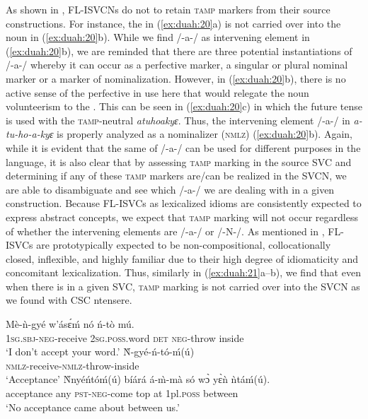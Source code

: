\documentclass[output=paper
,newtxmath
,modfonts
,nonflat]{langsci/langscibook}
\begin{document}
As shown in , FL-ISVCNs do not to retain \textsc{tamp} markers from their source constructions. For instance, the  in (\ref{ex:duah:20}a) is not carried over into the noun in (\ref{ex:duah:20}b). While we find /-a-/ as intervening element in (\ref{ex:duah:20}b), we are reminded that there are three potential instantiations of /-a-/ whereby it can occur as a perfective marker, a singular or plural nominal marker or a marker of nominalization. However, in (\ref{ex:duah:20}b), there is no active sense of the perfective in use here that would relegate the noun volunteerism to the . This can be seen in (\ref{ex:duah:20}c) in which the future tense is used with the \textsc{tamp}-neutral \textit{atuhoakyɛ}. Thus, the intervening element /-a-/ in \textit{a-tu-ho-a-kyɛ} is properly analyzed as a nominalizer (\textsc{nmlz}) (\ref{ex:duah:20}b). Again, while it is evident that the same  of /-a-/ can be used for different purposes in the language, it is also clear that by assessing \textsc{tamp} marking in the source SVC and determining if any of these \textsc{tamp} markers are/can be realized in the SVCN, we are able to disambiguate and see which /-a-/ we are dealing with in a given construction. Because FL-ISVCs as lexicalized idioms are consistently expected to express abstract concepts, we expect that \textsc{tamp} marking will not occur regardless of whether the intervening elements are /-a-/ or /-N-/. As mentioned in , FL-ISVCs are prototypically expected to be non-compositional, collocationally closed, inflexible, and highly familiar due to their high degree of idiomaticity and concomitant lexicalization. Thus, similarly in (\ref{ex:duah:21}a--b), we find that even when there is  in a given SVC, \textsc{tamp} marking is not carried over into the SVCN as we found with CSC ntensere.

\ea\label{ex:duah:21}
\ea\label{ex:duah:21a}
\gll Mè-ǹ-gyé w’ásɛ́ḿ nó ń-tò mú.\\
1\textsc{sg}.\textsc{sbj}-\textsc{neg}-receive	2\textsc{sg}.\textsc{poss}.word \textsc{det}	\textsc{neg}-throw inside\\
\glt `I don’t accept your word.'
\ex\label{ex:duah:21b}
\gll Ǹ-gyé-ń-tó-ḿ(ú)\\
\textsc{nmlz}-receive-\textsc{nmlz}-throw-inside\\
\glt `Acceptance'
\ex\label{ex:duah:21c}
\gll Ǹnyéńtóḿ(ú)	bíárá á-m̀-mà só wɔ̀ yɛ̀ǹ ǹtáḿ(ú).\\
acceptance any \textsc{pst}-\textsc{neg}-come top at 1pl.\textsc{poss} between\\
\glt `No acceptance came about between us.'
\z
\z
\end{document}
